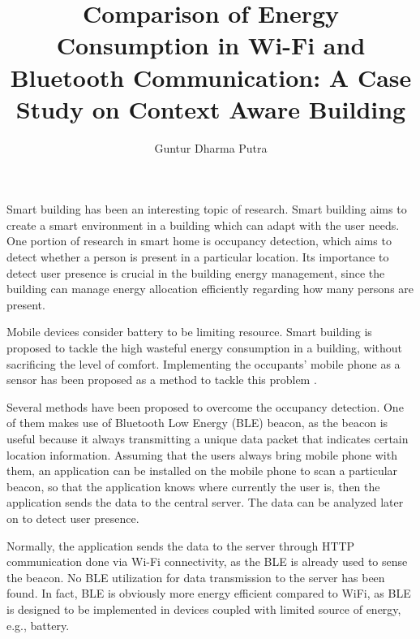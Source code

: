 \documentclass[journal]{vgtc}                %
\title{Comparison of Energy Consumption in Wi-Fi and Bluetooth Communication: A Case Study on Context Aware Building}
\author{Guntur Dharma Putra}
\begin{document}


\maketitle
Smart building has been an interesting topic of research. Smart building aims to create a smart environment in a building which can adapt with the user needs. One portion of research in smart home is occupancy detection, which aims to detect whether a person is present in a particular location. Its importance to detect user presence is crucial in the building energy management, since the building can manage energy allocation efficiently regarding how many persons are present.

Mobile devices consider battery to be limiting resource.
Smart building is proposed to tackle the high wasteful energy consumption in a building, without sacrificing the level of comfort.
Implementing the occupants' mobile phone as a sensor has been proposed as a method to tackle this problem \cite{Conte2014}.

Several methods have been proposed to overcome the occupancy detection. One of them makes use of Bluetooth Low Energy (BLE) beacon, as the beacon is useful because it always transmitting a unique data packet that indicates certain location information. Assuming that the users always bring mobile phone with them, an application can be installed on the mobile phone to scan a particular beacon, so that the application knows where currently the user is, then the application sends the data to the central server. The data can be analyzed later on to detect user presence.

Normally, the application sends the data to the server through HTTP communication done via Wi-Fi connectivity, as the BLE is already used to sense the beacon. No BLE utilization for data transmission to the server has been found. In fact, BLE is obviously more energy efficient compared to WiFi, as BLE is designed to be implemented in devices coupled with limited source of energy, e.g., battery.
\end{document}
